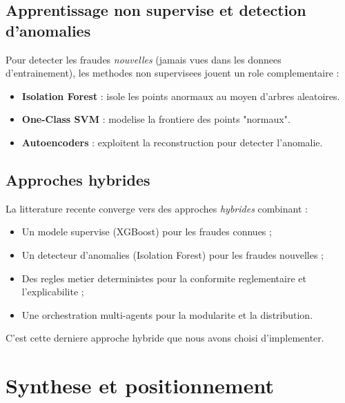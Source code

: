 \documentclass[12pt,a4paper,oneside]{report}
\begin{document}
\subsection{Apprentissage non supervise et detection d'anomalies}

Pour detecter les fraudes \emph{nouvelles} (jamais vues dans les donnees
d'entrainement), les methodes non supervisees jouent un role complementaire :

\begin{itemize}[leftmargin=*]
  \item \textbf{Isolation Forest} : isole les points anormaux au moyen d'arbres
        aleatoires.
  \item \textbf{One-Class SVM} : modelise la frontiere des points "normaux".
  \item \textbf{Autoencoders} : exploitent la reconstruction pour detecter
        l'anomalie.
\end{itemize}

\subsection{Approches hybrides}

La litterature recente \cite{west2016intelligent,abakarim2018hybrid} converge
vers des approches \emph{hybrides} combinant :

\begin{itemize}[leftmargin=*]
  \item Un modele supervise (XGBoost) pour les fraudes connues ;
  \item Un detecteur d'anomalies (Isolation Forest) pour les fraudes nouvelles ;
  \item Des regles metier deterministes pour la conformite reglementaire et
        l'explicabilite ;
  \item Une orchestration multi-agents pour la modularite et la
        distribution.
\end{itemize}

C'est cette derniere approche hybride que nous avons choisi d'implementer.

\section{Synthese et positionnement}
\end{document}
